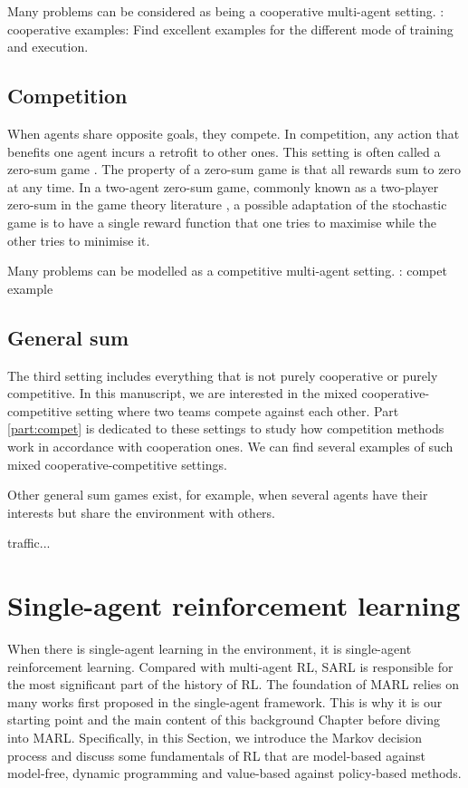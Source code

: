 Many problems can be considered as being a cooperative multi-agent setting.
\todo: cooperative examples: Find excellent examples for the different mode of training and execution.

\subsection{Competition} 
\label{sec:ch2_Competition}
When agents share opposite goals, they compete.
In competition, any action that benefits one agent incurs a retrofit to other ones.
This setting is often called a zero-sum game \citep{}.
The property of a zero-sum game is that all rewards sum to zero at any time.
In a two-agent zero-sum game, commonly known as a two-player zero-sum in the game theory literature \citep{}, a possible adaptation of the stochastic game is to have a single reward function that one tries to maximise while the other tries to minimise it.

Many problems can be modelled as a competitive multi-agent setting.
\todo: compet example



\subsection{General sum} 
\label{sec:ch2_general_sum}
The third setting includes everything that is not purely cooperative or purely competitive.
In this manuscript, we are interested in the mixed cooperative-competitive setting where two teams compete against each other.
Part \ref{part:compet} is dedicated to these settings to study how competition methods work in accordance with cooperation ones.
\todo We can find several examples of such mixed cooperative-competitive settings.


Other general sum games exist, for example, when several agents have their interests but share the environment with others.

\todo traffic...


\section{Single-agent reinforcement learning} 
\label{sec:ch2_single_agent_RL}
When there is single-agent learning in the environment, it is single-agent reinforcement learning.
Compared with multi-agent RL, SARL is responsible for the most significant part of the history of RL.
The foundation of MARL relies on many works first proposed in the single-agent framework.
This is why it is our starting point and the main content of this background Chapter before diving into MARL.
Specifically, in this Section, we introduce the Markov decision process and discuss some fundamentals of RL that are model-based against model-free, dynamic programming and value-based against policy-based methods.

